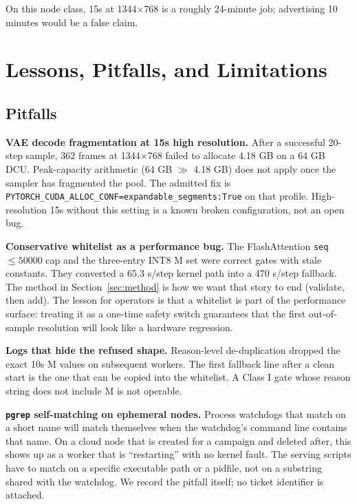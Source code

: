 \documentclass[11pt]{article}
\begin{document}
On this node class, 15s at 1344$\times$768 is a roughly 24-minute job; advertising 10 minutes would be a false claim.

\section{Lessons, Pitfalls, and Limitations}
\label{sec:lessons}

\subsection{Pitfalls}
\label{sec:pitfalls}

\textbf{VAE decode fragmentation at 15s high resolution.} After a successful 20-step sample, 362 frames at 1344$\times$768 failed to allocate 4.18 GB on a 64 GB DCU. Peak-capacity arithmetic (64 GB $\gg$ 4.18 GB) does not apply once the sampler has fragmented the pool. The admitted fix is \texttt{PYTORCH\_CUDA\_ALLOC\_CONF=expandable\_segments:True} on that profile. High-resolution 15s without this setting is a known broken configuration, not an open bug.

\textbf{Conservative whitelist as a performance bug.} The FlashAttention \texttt{seq} $\leq 50000$ cap and the three-entry INT8 M set were correct gates with stale constants. They converted a 65.3 s/step kernel path into a 470 s/step fallback. The method in Section~\ref{sec:method} is how we want that story to end (validate, then add). The lesson for operators is that a whitelist is part of the performance surface: treating it as a one-time safety switch guarantees that the first out-of-sample resolution will look like a hardware regression.

\textbf{Logs that hide the refused shape.} Reason-level de-duplication dropped the exact 10s M values on subsequent workers. The first fallback line after a clean start is the one that can be copied into the whitelist. A Class I gate whose reason string does not include M is not operable.

\textbf{\texttt{pgrep} self-matching on ephemeral nodes.} Process watchdogs that match on a short name will match themselves when the watchdog's command line contains that name. On a cloud node that is created for a campaign and deleted after, this shows up as a worker that is ``restarting'' with no kernel fault. The serving scripts have to match on a specific executable path or a pidfile, not on a substring shared with the watchdog. We record the pitfall itself; no ticket identifier is attached.
\end{document}
